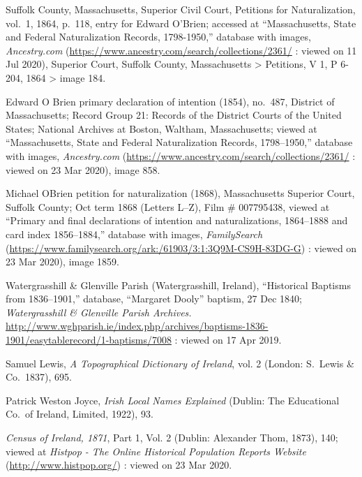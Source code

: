 \textbf{}\begin{thebibliography}{999}
\raggedright
\small
	
Suffolk County, Massachusetts, Superior Civil Court, Petitions for Naturalization, vol.\ 1, 1864, p.\ 118, entry for Edward O'Brien; accessed at ``Massachusetts, State and Federal Naturalization Records, 1798-1950,'' database with images, \textit{Ancestry.com} (\url{https://www.ancestry.com/search/collections/2361/} : viewed on 11 Jul 2020), Superior Court, Suffolk County, Massachusetts > Petitions, V 1, P 6-204, 1864 > image 184.
	
Edward O Brien primary declaration of intention (1854), no.\ 487, 
District of Massachusetts; 
Record Group 21: Records of the District Courts of the United States; 
National Archives at Boston, Waltham, Massachusetts;
viewed at ``Massachusetts, State and Federal Naturalization Records, 1798--1950,''
database with images, \textit{Ancestry.com} (\url{https://www.ancestry.com/search/collections/2361/} : viewed on 23 Mar 2020), image 858.

Michael OBrien petition for naturalization (1868), 
Massachusetts Superior Court, Suffolk County; 
Oct term 1868 (Letters L--Z), Film \# 007795438,
viewed at ``Primary and final declarations of intention and naturalizations, 1864--1888 and card index 1856--1884,''
database with images, \textit{FamilySearch} (\url{https://www.familysearch.org/ark:/61903/3:1:3Q9M-CS9H-83DG-G}) : viewed on 23 Mar 2020), image 1859.

Watergrasshill \& Glenville Parish (Watergrasshill, Ireland), ``Historical Baptisms from 1836--1901,'' database, ``Margaret Dooly'' baptism, 27 Dec 1840; \textit{Watergrasshill \& Glenville Parish Archives.} \url{http://www.wghparish.ie/index.php/archives/baptisms-1836-1901/easytablerecord/1-baptisms/7008} : viewed on 17 Apr 2019.

Samuel Lewis, \textit{A Topographical Dictionary of Ireland}, vol. 2 (London: S.\ Lewis \& Co.\, 1837), 695.

Patrick Weston Joyce, \textit{Irish Local Names Explained} (Dublin: The Educational Co.\ of Ireland, Limited, 1922), 93.

\textit{Census of Ireland, 1871}, Part 1, Vol. 2 (Dublin: Alexander Thom, 1873), 140; viewed at \textit{Histpop - The Online Historical Population Reports Website} (\url{http://www.histpop.org/}) : viewed on 23 Mar 2020.


\end{thebibliography}
